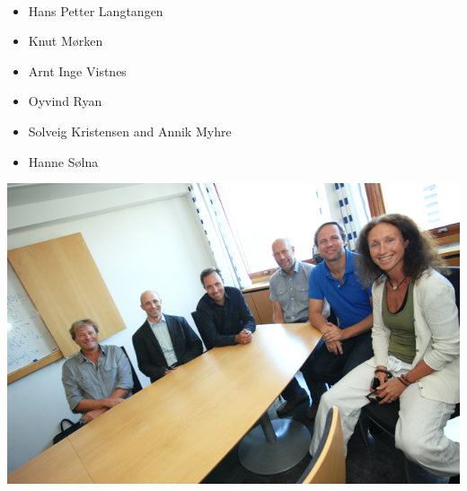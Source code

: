 \documentclass[%
twoside,                 %
final,                   %
10pt]{article}
\begin{document}

\paragraph{}
\begin{itemize}
\item Hans Petter Langtangen

\item Knut Mørken

\item Arnt Inge Vistnes

\item Oyvind Ryan

\item Solveig Kristensen and Annik Myhre

\item Hanne Sølna
\end{itemize}

\noindent





\centerline{\includegraphics[width=1.0\linewidth]{fig-future/thegang.jpg}}













\printindex
\end{document}
